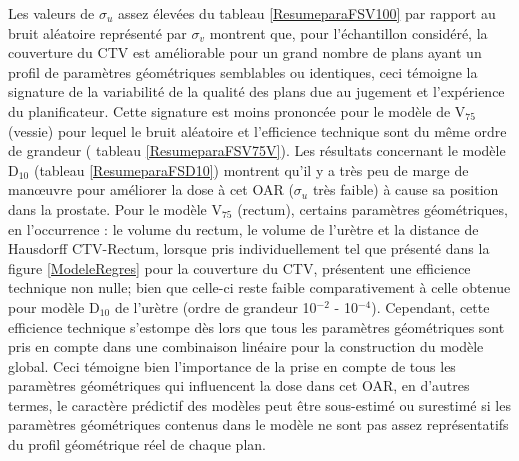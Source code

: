 %
Les valeurs de $\sigma_{u}$ assez élevées du tableau \ref{ResumeparaFSV100} par rapport au bruit aléatoire représenté par $\sigma_{v}$ montrent que, pour l'échantillon considéré, la couverture du CTV est améliorable pour un grand nombre de plans ayant un profil de paramètres géométriques semblables ou identiques, ceci témoigne la signature de la variabilité de la qualité des plans due au jugement et l’expérience du planificateur. Cette signature est moins prononcée pour le modèle de V$_{75}$ (vessie) pour lequel le bruit aléatoire et l’efficience technique sont du même ordre de grandeur ( tableau \ref{ResumeparaFSV75V}). Les résultats concernant le modèle D$_{10}$ (tableau \ref{ResumeparaFSD10}) montrent qu’il y a très peu de marge de manœuvre pour améliorer la dose à cet OAR ($\sigma_{u}$ très faible) à cause sa position dans la prostate. Pour le modèle V$_{75}$ (rectum), certains paramètres géométriques, en l’occurrence : le volume du rectum, le volume de l’urètre et la distance de Hausdorff CTV-Rectum, lorsque pris individuellement tel que présenté dans la figure \ref{ModeleRegres} pour la couverture du CTV, présentent une efficience technique non nulle; bien que celle-ci reste faible comparativement à celle obtenue pour modèle D$_{10}$ de l'urètre (ordre de grandeur 10$^{-2}$ - 10$^{-4}$). Cependant, cette efficience technique s’estompe dès lors que tous les paramètres géométriques sont pris en compte dans une combinaison linéaire pour la construction du modèle global. Ceci témoigne bien l’importance de la prise en compte de tous les paramètres géométriques qui influencent la dose dans cet OAR, en d’autres termes, le caractère prédictif des modèles peut être sous-estimé ou surestimé si les paramètres géométriques contenus dans le modèle ne sont pas assez représentatifs du profil géométrique réel de chaque plan.
%
